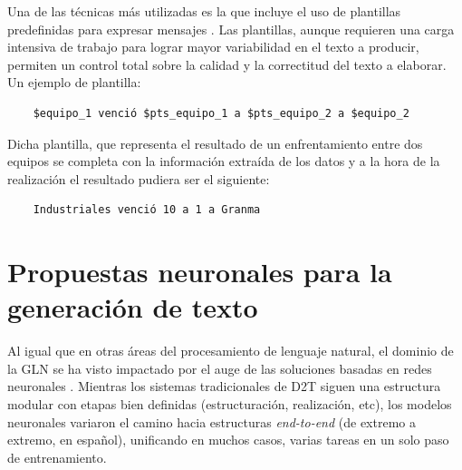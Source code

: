     Una de las t\'ecnicas m\'as utilizadas es la que incluye el uso de plantillas predefinidas para expresar mensajes . Las 
plantillas, aunque requieren una carga intensiva de trabajo para lograr mayor variabilidad en el texto a producir, permiten un control total sobre 
la calidad y la correctitud del texto a elaborar. Un ejemplo de plantilla:

\begin{verbatim}
    $equipo_1 venció $pts_equipo_1 a $pts_equipo_2 a $equipo_2
\end{verbatim}

    Dicha plantilla, que representa el resultado de un enfrentamiento entre dos equipos se completa con la información extraída de los datos y a la hora de 
la realización el resultado pudiera ser el siguiente:

\begin{verbatim}
    Industriales venció 10 a 1 a Granma
\end{verbatim}

\section{Propuestas neuronales para la generación de texto}
    Al igual que en otras áreas del procesamiento de lenguaje natural, el dominio de la GLN se ha visto 
impactado por el auge de las soluciones basadas en redes neuronales . 
Mientras los sistemas tradicionales de D2T siguen una estructura modular con etapas bien definidas (estructuración, realización, etc), 
los modelos neuronales variaron el camino hacia estructuras \emph{end-to-end} (de extremo a extremo, en español), unificando 
en muchos casos, varias tareas en un solo paso de entrenamiento.

